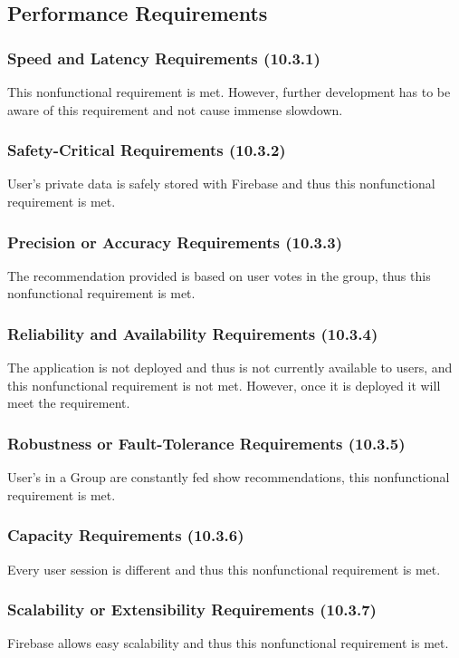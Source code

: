 \documentclass[12pt, titlepage]{article}
\begin{document}
\subsection{Performance Requirements}
\subsubsection{Speed and Latency Requirements (10.3.1)}
This nonfunctional requirement is met. However, further development has to be aware of this requirement and not cause immense slowdown.

\subsubsection{Safety-Critical Requirements (10.3.2)}
User's private data is safely stored with Firebase and thus this nonfunctional requirement is met.

\subsubsection{Precision or Accuracy Requirements (10.3.3)}
The recommendation provided is based on user votes in the group, thus this nonfunctional requirement is met.

\subsubsection{Reliability and Availability Requirements (10.3.4)}
The application is not deployed and thus is not currently available to users, and this nonfunctional requirement is not met. However, once it is deployed it will meet the requirement.

\subsubsection{Robustness or Fault-Tolerance Requirements (10.3.5)}
User's in a Group are constantly fed show recommendations, this nonfunctional requirement is met.

\subsubsection{Capacity Requirements (10.3.6)}
Every user session is different and thus this nonfunctional requirement is met.

\subsubsection{Scalability or Extensibility Requirements (10.3.7)}
Firebase allows easy scalability and thus this nonfunctional requirement is met.
\end{document}
